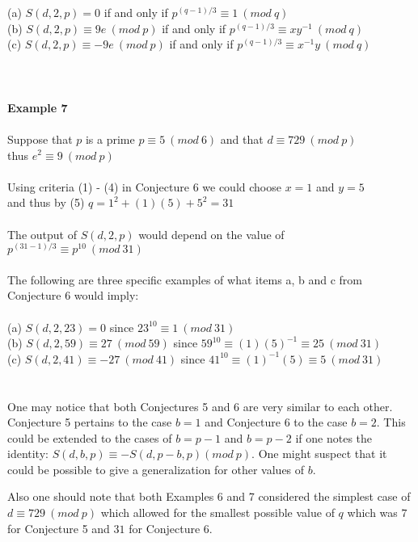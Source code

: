 \documentclass[final,letterpaper,oneside,10pt]{article}
\begin{document}
\\
\\
(a) $S(d,2,p) = 0$ if and only if $p^{(q-1)/3} \equiv 1~(mod~q)$
\\
(b) $S(d,2,p) \equiv 9e~(mod~p)$  if and only if $p^{(q-1)/3} \equiv xy^{-1}~(mod~q)$
\\
(c) $S(d,2,p) \equiv -9e~(mod~p)$  if and only if $p^{(q-1)/3} \equiv x^{-1}y~(mod~q)$
\\
\\
\\
\\
\textbf{Example 7}
\\
\\
Suppose that $p$ is a prime $p \equiv 5~(mod~6)$ and that $d \equiv 729~(mod~p)$ 
\\
thus $e^2 \equiv 9~(mod~p)$
\\
\\
Using criteria (1) - (4) in Conjecture 6 we could choose $x=1$ and $y=5$
\\
and thus by (5) $q = 1^2 + (1)(5) + 5^2 = 31$
\\
\\
The output of $S(d,2,p)$ would depend on the value of $p^{(31-1)/3} \equiv p^{10}~(mod~31)$
\\
\\
The following are three specific examples of what items a, b and c from Conjecture 6 would imply:
\\
\\
(a) $S(d,2,23) = 0$ since $23^{10} \equiv  1~(mod~31)$
\\
(b) $S(d,2,59) \equiv 27~(mod~59)$ since $59^{10} \equiv (1)(5)^{-1} \equiv 25~(mod~31)$
\\
(c) $S(d,2,41) \equiv -27~(mod~41)$ since $41^{10} \equiv (1)^{-1}(5) \equiv 5~(mod~31)$
\\
\\
\\
One may notice that both Conjectures 5 and 6 are very similar to each other.  Conjecture 5 pertains to the case $b=1$ and Conjecture 6 to the 
case $b=2$.  This could be extended to the cases of $b=p-1$ and $b=p-2$ if one notes the identity: $S(d,b,p) \equiv -S(d,p-b,p)(mod~p)$.
One might suspect that it could be possible to give a generalization for other values of $b$. 

Also one should note that both Examples 6 and 7 considered the simplest case of $d \equiv 729~(mod~p)$ which allowed for the smallest possible 
value of $q$ which was $7$ for Conjecture 5 and $31$ for Conjecture 6.
\\
\end{document}
